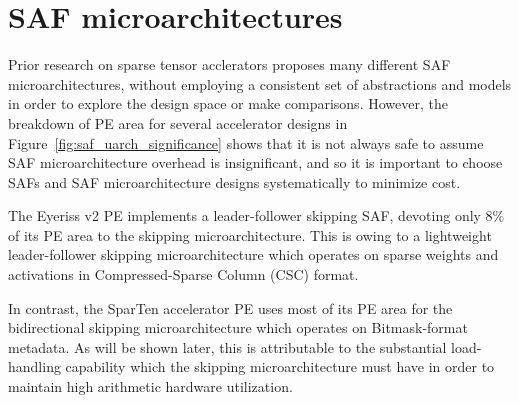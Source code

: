 \section{SAF microarchitectures}

Prior research on sparse tensor acclerators proposes many different SAF microarchitectures, without employing a consistent set of abstractions and models in order to explore the design space or make comparisons. However, the breakdown of PE area for several accelerator designs in Figure~\ref{fig:saf_uarch_significance} shows that it is not always safe to assume SAF microarchitecture overhead is insignificant, and so it is important to choose SAFs and SAF microarchitecture designs systematically to minimize cost.

The Eyeriss v2\cite{eyerissv2} PE implements a leader-follower skipping SAF, devoting only 8\% of its PE area to the skipping microarchitecture. This is owing to a lightweight leader-follower skipping microarchitecture which operates on sparse weights and activations in Compressed-Sparse Column (CSC) format. 

In contrast, the SparTen\cite{sparten} accelerator PE uses most of its PE area for the bidirectional skipping microarchitecture which operates on Bitmask-format metadata. As will be shown later, this is attributable to the substantial load-handling capability which the skipping microarchitecture must have in order to maintain high arithmetic hardware utilization. 

